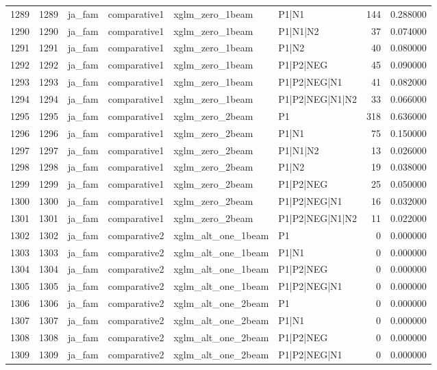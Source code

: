\begin{tabular}{lrllllrr}
1289 & 1289 & ja_fam & comparative1 & xglm_zero_1beam & P1|N1 & 144 & 0.288000 \\
1290 & 1290 & ja_fam & comparative1 & xglm_zero_1beam & P1|N1|N2 & 37 & 0.074000 \\
1291 & 1291 & ja_fam & comparative1 & xglm_zero_1beam & P1|N2 & 40 & 0.080000 \\
1292 & 1292 & ja_fam & comparative1 & xglm_zero_1beam & P1|P2|NEG & 45 & 0.090000 \\
1293 & 1293 & ja_fam & comparative1 & xglm_zero_1beam & P1|P2|NEG|N1 & 41 & 0.082000 \\
1294 & 1294 & ja_fam & comparative1 & xglm_zero_1beam & P1|P2|NEG|N1|N2 & 33 & 0.066000 \\
1295 & 1295 & ja_fam & comparative1 & xglm_zero_2beam & P1 & 318 & 0.636000 \\
1296 & 1296 & ja_fam & comparative1 & xglm_zero_2beam & P1|N1 & 75 & 0.150000 \\
1297 & 1297 & ja_fam & comparative1 & xglm_zero_2beam & P1|N1|N2 & 13 & 0.026000 \\
1298 & 1298 & ja_fam & comparative1 & xglm_zero_2beam & P1|N2 & 19 & 0.038000 \\
1299 & 1299 & ja_fam & comparative1 & xglm_zero_2beam & P1|P2|NEG & 25 & 0.050000 \\
1300 & 1300 & ja_fam & comparative1 & xglm_zero_2beam & P1|P2|NEG|N1 & 16 & 0.032000 \\
1301 & 1301 & ja_fam & comparative1 & xglm_zero_2beam & P1|P2|NEG|N1|N2 & 11 & 0.022000 \\
1302 & 1302 & ja_fam & comparative2 & xglm_alt_one_1beam & P1 & 0 & 0.000000 \\
1303 & 1303 & ja_fam & comparative2 & xglm_alt_one_1beam & P1|N1 & 0 & 0.000000 \\
1304 & 1304 & ja_fam & comparative2 & xglm_alt_one_1beam & P1|P2|NEG & 0 & 0.000000 \\
1305 & 1305 & ja_fam & comparative2 & xglm_alt_one_1beam & P1|P2|NEG|N1 & 0 & 0.000000 \\
1306 & 1306 & ja_fam & comparative2 & xglm_alt_one_2beam & P1 & 0 & 0.000000 \\
1307 & 1307 & ja_fam & comparative2 & xglm_alt_one_2beam & P1|N1 & 0 & 0.000000 \\
1308 & 1308 & ja_fam & comparative2 & xglm_alt_one_2beam & P1|P2|NEG & 0 & 0.000000 \\
1309 & 1309 & ja_fam & comparative2 & xglm_alt_one_2beam & P1|P2|NEG|N1 & 0 & 0.000000 \\

\end{tabular}
